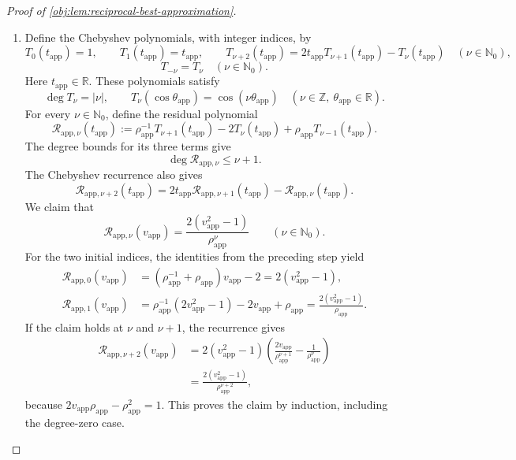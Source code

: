 \begin{proof}[Proof of \cref{obj:lem:reciprocal-best-approximation}]
\begin{enumerate}
\item Define the Chebyshev polynomials, with integer indices, by
\[
T_0(t_{\mathrm{app}})=1,\qquad
T_1(t_{\mathrm{app}})=t_{\mathrm{app}},\qquad
T_{\nu+2}(t_{\mathrm{app}})
=2t_{\mathrm{app}}T_{\nu+1}(t_{\mathrm{app}})
-T_\nu(t_{\mathrm{app}})
\quad(\nu\in\mathbb N_0),
\]
\[
T_{-\nu}=T_\nu\quad(\nu\in\mathbb N_0).
\]
Here \(t_{\mathrm{app}}\in\mathbb R\). These polynomials satisfy
\[
\deg T_\nu=|\nu|,
\qquad
T_\nu(\cos\theta_{\mathrm{app}})
=\cos(\nu\theta_{\mathrm{app}})
\quad(\nu\in\mathbb Z,\ \theta_{\mathrm{app}}\in\mathbb R).
\]
For every \(\nu\in\mathbb N_0\), define the residual polynomial
\[
\mathcal R_{\mathrm{app},\nu}(t_{\mathrm{app}})
:=
\rho_{\mathrm{app}}^{-1}T_{\nu+1}(t_{\mathrm{app}})
-2T_\nu(t_{\mathrm{app}})
+\rho_{\mathrm{app}}T_{\nu-1}(t_{\mathrm{app}}).
\]
The degree bounds for its three terms give
\[
\deg\mathcal R_{\mathrm{app},\nu}\le \nu+1.
\]
The Chebyshev recurrence also gives
\[
\mathcal R_{\mathrm{app},\nu+2}(t_{\mathrm{app}})
=
2t_{\mathrm{app}}\mathcal R_{\mathrm{app},\nu+1}(t_{\mathrm{app}})
-\mathcal R_{\mathrm{app},\nu}(t_{\mathrm{app}}).
\]
We claim that
\[
\mathcal R_{\mathrm{app},\nu}(v_{\mathrm{app}})
=
\frac{2(v_{\mathrm{app}}^2-1)}
{\rho_{\mathrm{app}}^\nu}
\qquad(\nu\in\mathbb N_0).
\]
For the two initial indices, the identities from the preceding step yield
\[
\begin{aligned}
\mathcal R_{\mathrm{app},0}(v_{\mathrm{app}})
&=(\rho_{\mathrm{app}}^{-1}+\rho_{\mathrm{app}})
v_{\mathrm{app}}-2
=2(v_{\mathrm{app}}^2-1),\\
\mathcal R_{\mathrm{app},1}(v_{\mathrm{app}})
&=\rho_{\mathrm{app}}^{-1}(2v_{\mathrm{app}}^2-1)
-2v_{\mathrm{app}}+\rho_{\mathrm{app}}
=\frac{2(v_{\mathrm{app}}^2-1)}{\rho_{\mathrm{app}}}.
\end{aligned}
\]
If the claim holds at \(\nu\) and \(\nu+1\), the recurrence gives
\[
\begin{aligned}
\mathcal R_{\mathrm{app},\nu+2}(v_{\mathrm{app}})
&=
2(v_{\mathrm{app}}^2-1)
\left(
\frac{2v_{\mathrm{app}}}{\rho_{\mathrm{app}}^{\nu+1}}
-\frac{1}{\rho_{\mathrm{app}}^\nu}
\right)\\
&=
\frac{2(v_{\mathrm{app}}^2-1)}
{\rho_{\mathrm{app}}^{\nu+2}},
\end{aligned}
\]
because \(2v_{\mathrm{app}}\rho_{\mathrm{app}}
-\rho_{\mathrm{app}}^2=1\). This proves the claim by induction, including the degree-zero case.


\end{enumerate}
\end{proof}

